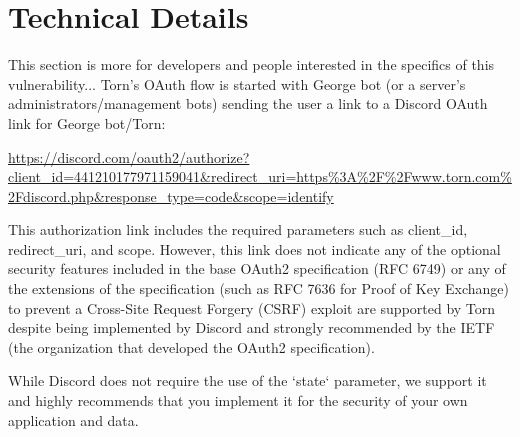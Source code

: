 \documentclass{article}
\begin{document}
{\section{Technical Details} \label{sec:technical-details}
\par{This section is more for developers and people interested in the specifics of this vulnerability... Torn's OAuth flow is started with George bot (or a server's administrators/management bots) sending the user a link to a Discord OAuth link for George bot/Torn:}

\justifying
\begin{displayquote}
	\url{https://discord.com/oauth2/authorize?client_id=441210177971159041&redirect_uri=https%3A%2F%2Fwww.torn.com%2Fdiscord.php&response_type=code&scope=identify}
\end{displayquote}

\raggedright
\par{This authorization link includes the required parameters such as client\_id, redirect\_uri, and scope. However, this link does not indicate any of the optional security features included in the base OAuth2 specification (RFC 6749) or any of the extensions of the specification (such as RFC 7636 for Proof of Key Exchange) to prevent a Cross-Site Request Forgery (CSRF) exploit are supported by Torn despite being implemented by Discord \cite{discord-oauth-csrf} and strongly recommended by the IETF (the organization that developed the OAuth2 specification).}

\begin{displayquote}
	While Discord does not require the use of the `state` parameter, we support it and highly recommends that you implement it for the security of your own application and data.
\end{displayquote}

}
\end{document}
